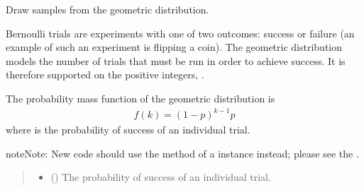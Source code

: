 \documentclass[letterpaper,10pt,english]{sphinxmanual}
\begin{document}

\begin{fulllineitems}
\label{\detokenize{metilda.controllers:metilda.controllers.pitch_art_wizard.geometric}}
\pysigstartsignatures
{}
\pysigstopsignatures
\sphinxAtStartPar
Draw samples from the geometric distribution.

\sphinxAtStartPar
Bernoulli trials are experiments with one of two outcomes:
success or failure (an example of such an experiment is flipping
a coin).  The geometric distribution models the number of trials
that must be run in order to achieve success.  It is therefore
supported on the positive integers, .

\sphinxAtStartPar
The probability mass function of the geometric distribution is
\begin{equation*}
\begin{split}f(k) = (1 - p)^{k - 1} p\end{split}
\end{equation*}
\sphinxAtStartPar
where  is the probability of success of an individual trial.

\begin{sphinxadmonition}{note}{Note:}
\sphinxAtStartPar
New code should use the 
method of a  instance instead;
please see the .
\end{sphinxadmonition}
\begin{quote}\begin{description}
\begin{itemize}
\item {} 
\sphinxAtStartPar
{} () \textendash{} The probability of success of an individual trial.


\end{itemize}
\end{description}
\end{quote}
\end{fulllineitems}
\end{document}

